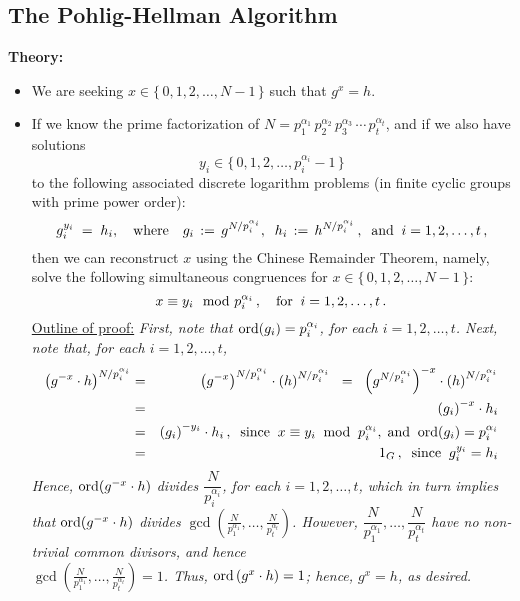 \subsection{The Pohlig-Hellman Algorithm}

\noindent
\textbf{Theory:}
\begin{itemize}
\item	We are seeking $x \in \{\,0,1,2,\ldots,N-1\,\}$ such that $g^{x} = h$.
\item	If we know the prime factorization of $N = p_{1}^{\alpha_{1}}\,p_{2}^{\alpha_{2}}\,p_{3}^{\alpha_{3}}\,\cdots\,p_{t}^{\alpha_{t}}$,
		and if we also have solutions
		\begin{equation*}
		y_{i} \in \{\,0,1,2,\ldots,p_{i}^{\alpha_{i}}-1\,\}
		\end{equation*}
		to the following associated discrete logarithm problems (in finite cyclic groups with prime power order):
		\begin{equation*}
		g_{i}^{y_{i}} \; = \; h_{i},
		\quad\textnormal{where}\quad g_{i} \, := \, g^{N/p_{i}^{\alpha_{i}}},
		\;\;
		h_{i} \, := \, h^{N/p_{i}^{\alpha_{i}}}\,,
		\;\;\textnormal{and}\;\;
		i = 1,2,\ldots,t\,,
		\end{equation*}
		then we can reconstruct $x$ using the Chinese Remainder Theorem, namely, solve the following simultaneous congruences
		for $x \in \{\,0,1,2,\ldots,N-1\,\}$:
		\begin{equation*}
		x \equiv y_{i}\mod p_{i}^{\alpha_{i}}\,,
		\quad\textnormal{for}\;\; i = 1,2,\ldots,t\,.
		\end{equation*}
		\underline{Outline of proof:}\vskip 0.1cm
		\textit{First, note that $\textnormal{ord}(g_{i}) = p_{i}^{\alpha_{i}}$, for each $i = 1,2,\ldots,t$.
		Next, note that, for each $i = 1,2,\ldots,t$,
		\begin{eqnarray*}
		\left(g^{-x}\cdot h\right)^{N/p_{i}^{\alpha_{i}}}
		&=& \left(g^{-x}\right)^{N/p_{i}^{\alpha_{i}}} \cdot \left(h\right)^{N/p_{i}^{\alpha_{i}}}
		\;\;=\;\; \left(g^{N/p_{i}^{\alpha_{i}}}\right)^{-x} \cdot \left(h\right)^{N/p_{i}^{\alpha_{i}}} \\
		&=& \left(g_{i}\right)^{-x} \cdot h_{i} \\
		&=& \left(g_{i}\right)^{-y_{i}} \cdot h_{i}\,,
			\;\;\textnormal{since}\;\; x \equiv y_{i}\;\;\textnormal{mod}\;\;p_{i}^{\alpha_{i}},
			\;\textnormal{and}\;\;\textnormal{ord}(g_{i}) = p_{i}^{\alpha_{i}} \\
		&=& 1_{G}\,,\;\;\textnormal{since}\;\;g_{i}^{y_{i}} = h_{i}\\
		\end{eqnarray*}
		Hence, $\textnormal{ord}(g^{-x}\cdot h)$ divides $\dfrac{N}{p_{i}^{\alpha_{i}}}$, for each $i = 1,2,\ldots,t$,
		which in turn implies that
		$\textnormal{ord}(g^{-x}\cdot h)$ divides $\gcd\left(\frac{N}{p_{1}^{\alpha_{1}}},\ldots,\frac{N}{p_{t}^{\alpha_{t}}}\right)$.
		However, $\dfrac{N}{p_{1}^{\alpha_{1}}},\ldots,\dfrac{N}{p_{t}^{\alpha_{t}}}$ have no non-trivial common divisors,
		and hence\\ $\gcd\left(\frac{N}{p_{1}^{\alpha_{1}}},\ldots,\frac{N}{p_{t}^{\alpha_{t}}}\right) = 1$.
		Thus, $\textnormal{ord}\left(g^{x}\cdot h\right) = 1$; hence, $g^{x} = h$, as desired.
		}


\end{itemize}

